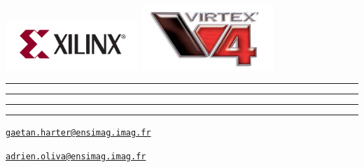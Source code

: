 \documentclass[a4paper,10pt]{article}
\begin{document}
\begin{flushright}

\includegraphics[width=5cm]{../img/xilinx.png}
\includegraphics[width=5cm]{../img/virtex4.png}

\rule{11cm}{0.5pt}

\vspace{-3mm}
\rule{7cm}{0.5pt}

\vspace{-3mm}
\rule{5cm}{0.5pt}

\vspace{-3mm}
\rule{4cm}{0.5pt}

\vspace{5mm}
\href{mailto:gaetan.harter@ensimag.imag.fr}
{\texttt{gaetan.harter@ensimag.imag.fr}}

\href{mailto:adrien.oliva@ensimag.imag.fr}
{\texttt{adrien.oliva@ensimag.imag.fr}}
\end{flushright}

\vfill
\eject

\tableofcontents

\vfill
\eject
\end{document}
